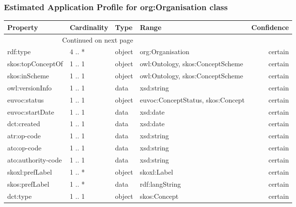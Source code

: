 \documentclass[10pt,a4paper,titlepage,final]{article}
\begin{document}
\subsubsection{Estimated Application Profile for org:Organisation class}
\begin{tabularx}{\textwidth}{lllXr}
\toprule
               Property & Cardinality &    Type &                                              Range & Confidence \\
\midrule
\endhead
\midrule
\multicolumn{3}{r}{{Continued on next page}} \\
\midrule
\endfoot

\bottomrule
\endlastfoot
               rdf:type &      4 .. * &  object &                                   org:Organisation &    certain \\
      skos:topConceptOf &      1 .. 1 &  object &                   owl:Ontology, skos:ConceptScheme &    certain \\
          skos:inScheme &      1 .. 1 &  object &                   owl:Ontology, skos:ConceptScheme &    certain \\
        owl:versionInfo &      1 .. 1 &    data &                                         xsd:string &    certain \\
           euvoc:status &      1 .. 1 &  object &                  euvoc:ConceptStatus, skos:Concept &    certain \\
        euvoc:startDate &      1 .. 1 &    data &                                           xsd:date &    certain \\
            dct:created &      1 .. 1 &    data &                                           xsd:date &    certain \\
            atr:op-code &      1 .. 1 &    data &                                         xsd:string &    certain \\
            ato:op-code &      1 .. 1 &    data &                                         xsd:string &    certain \\
     ato:authority-code &      1 .. 1 &    data &                                         xsd:string &    certain \\
        skoxl:prefLabel &      1 .. * &  object &                                        skoxl:Label &    certain \\
         skos:prefLabel &      1 .. * &    data &                                     rdf:langString &    certain \\
               dct:type &      1 .. 1 &  object &                                       skos:Concept &    certain \\

\end{tabularx}
\end{document}
